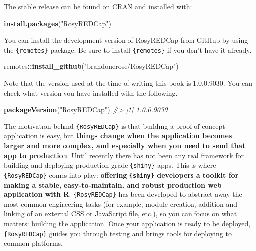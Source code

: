 \documentclass[
]{book}
\newenvironment{Shaded}{\begin{snugshade}}{\end{snugshade}}
\newcommand{\CommentTok}[1]{\textcolor[rgb]{0.56,0.35,0.01}{\textit{#1}}}
\newcommand{\FunctionTok}[1]{\textcolor[rgb]{0.13,0.29,0.53}{\textbf{#1}}}
\newcommand{\NormalTok}[1]{#1}
\newcommand{\SpecialCharTok}[1]{\textcolor[rgb]{0.81,0.36,0.00}{\textbf{#1}}}
\newcommand{\StringTok}[1]{\textcolor[rgb]{0.31,0.60,0.02}{#1}}
\begin{document}
The stable release can be found on CRAN and installed with:

\begin{Shaded}
\begin{Highlighting}[]
\FunctionTok{install.packages}\NormalTok{(}\StringTok{"RosyREDCap"}\NormalTok{)}
\end{Highlighting}
\end{Shaded}

You can install the development version of RosyREDCap from GitHub by using the \texttt{\{remotes\}} package.
Be sure to install \texttt{\{remotes\}} if you don't have it already.

\begin{Shaded}
\begin{Highlighting}[]
\NormalTok{remotes}\SpecialCharTok{::}\FunctionTok{install\_github}\NormalTok{(}\StringTok{"brandonerose/RosyREDCap"}\NormalTok{)}
\end{Highlighting}
\end{Shaded}

Note that the version used at the time of writing this book is 1.0.0.9030.
You can check what version you have installed with the following.

\begin{Shaded}
\begin{Highlighting}[]
\FunctionTok{packageVersion}\NormalTok{(}\StringTok{"RosyREDCap"}\NormalTok{)}
\CommentTok{\#\textgreater{} [1] \textquotesingle{}1.0.0.9030\textquotesingle{}}
\end{Highlighting}
\end{Shaded}

The motivation behind \texttt{\{RosyREDCap\}} is that building a proof-of-concept application is easy, but \textbf{things change when the application becomes larger and more complex, and especially when you need to send that app to production}.
Until recently there has not been any real framework for building and deploying production-grade \texttt{\{shiny\}} apps.
This is where \texttt{\{RosyREDCap\}} comes into play: \textbf{offering \texttt{\{shiny\}} developers a toolkit for making a stable, easy-to-maintain, and robust production web application with R}.
\texttt{\{RosyREDCap\}} has been developed to abstract away the most common engineering tasks (for example, module creation, addition and linking of an external CSS or JavaScript file, etc.), so you can focus on what matters: building the application.
Once your application is ready to be deployed, \texttt{\{RosyREDCap\}} guides you through testing and brings tools for deploying to common platforms.
\end{document}
